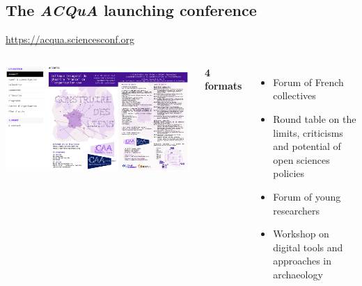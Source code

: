\documentclass[xcolor=dvipsnames, 10pt, french, american]{beamer}
\begin{document}
\subsection{The \emph{ACQuA} launching conference}
\frame{\tableofcontents[sectionstyle=show/shaded, subsectionstyle=show/shaded/hide]}
 

\begin{frame}

    \url{https://acqua.sciencesconf.org}
    
    \begin{columns}[t]
    	
    	
        \includegraphics[height=0.4\textheight]{figures/acqua2025}
    	
    	
    	\textbf{4 formats}
    	
    	\begin{itemize}
    		\item Forum of French collectives %
    		\item Round table on the limits, criticisms and potential of open sciences policies %
    		\item Forum of young researchers %
    		\item Workshop on digital tools and approaches in archaeology %
    	\end{itemize}
    \end{columns}
\end{frame}
\end{document}
